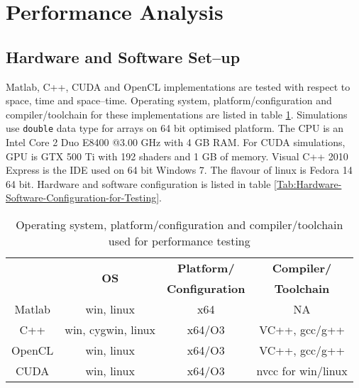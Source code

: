 \section{Performance Analysis}
\subsection{Hardware and Software Set--up}
Matlab, C++, CUDA and OpenCL implementations are tested with respect to space, time and space--time. Operating system, platform/configuration and compiler/toolchain for these implementations are listed in table \ref{Tab:OS-Platform/Configuration-Compiler/Toolchain-for-Testing}. Simulations use \verb|double| data type for arrays on 64 bit optimised platform. The CPU is an Intel Core 2 Duo E8400 @3.00 GHz with 4 GB RAM. For CUDA simulations, GPU is GTX 500 Ti with 192 shaders and 1 GB of memory. Visual C++ 2010 Express is the IDE used on 64 bit Windows 7. The flavour of linux is Fedora 14 64 bit. Hardware and software configuration is listed in table \ref{Tab:Hardware-Software-Configuration-for-Testing}.
\begin{table}[H]
\begin{center}
\vspace{0.3cm}
\SingleSpacing
	\begin{tabular}{cccc}
	\hline \hline
		\rule{0pt}{2.6ex} & \multirow{2}{*}{\textbf{OS}} & \textbf{Platform/} & \textbf{Compiler/}\\
		& & \textbf{Configuration} & \textbf{Toolchain}\\
		\hline
		Matlab \rule{0pt}{2.6ex} & win, linux & x64 & NA\\
		C++ & win, cygwin, linux & x64/O3 & VC++, gcc/g++\\
		OpenCL & win, linux & x64/O3 & VC++, gcc/g++\\
		CUDA & win, linux & x64/O3 & nvcc for win/linux\\
	\hline \hline
	\end{tabular}
\end{center}
\caption{Operating system, platform/configuration and compiler/toolchain used for performance testing}
\label{Tab:OS-Platform/Configuration-Compiler/Toolchain-for-Testing}
\end{table}
